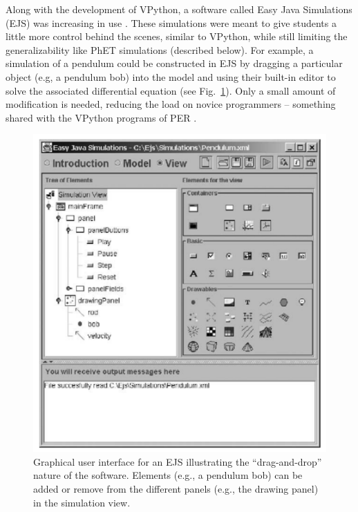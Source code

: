 \documentclass{msuphddissertation}
\begin{document}
\begin{doublespace}
Along with the development of VPython, a software called Easy Java Simulations (EJS) was increasing in use \cite{Esquembre2005}.  These simulations were meant to give students a little more control behind the scenes, similar to VPython, while still limiting the generalizability like PhET simulations (described below).  For example, a simulation of a pendulum could be constructed in EJS by dragging a particular object (e.g, a pendulum bob) into the model and using their built-in editor to solve the associated differential equation (see Fig.~\ref{CH2:EJS}).  Only a small amount of modification is needed, reducing the load on novice programmers -- something shared with the VPython programs of PER \cite{Weatherford2011}.

\begin{figure}\center
\includegraphics[scale=0.40]{images/CH2EJS.pdf}
\caption{Graphical user interface for an EJS illustrating the ``drag-and-drop'' nature of the software.  Elements (e.g., a pendulum bob) can be added or remove from the different panels (e.g., the drawing panel) in the simulation view.}\label{CH2:EJS}
\end{figure}


\end{doublespace}
\end{document}
